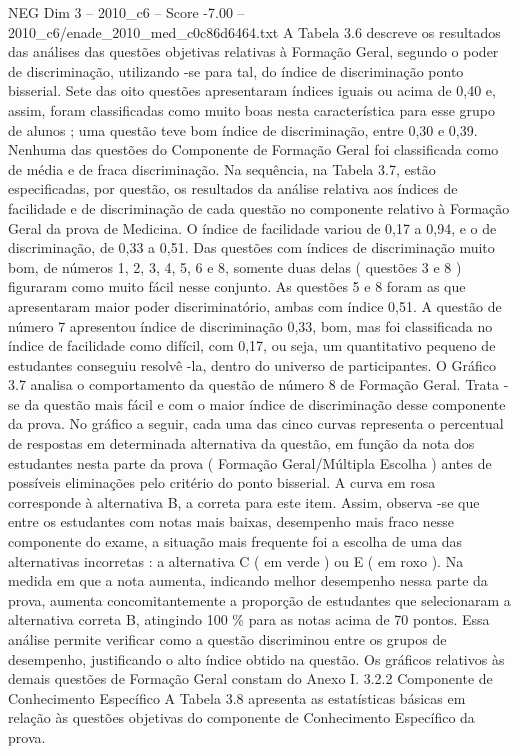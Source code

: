 \begin{textsample}{NEG Dim 3 – 2010\_c6 – Score -7.00 – 2010\_c6/enade\_2010\_med\_c0c86d6464.txt}
A Tabela 3.6 descreve os resultados das análises das questões objetivas relativas à Formação Geral, segundo o poder de discriminação, utilizando -se para tal, do índice de discriminação ponto bisserial.
Sete das oito questões apresentaram índices iguais ou acima de 0,40 e, assim, foram classificadas como muito boas nesta característica para esse grupo de alunos ; uma questão teve bom índice de discriminação, entre 0,30 e 0,39.
Nenhuma das questões do Componente de Formação Geral foi classificada como de média e de fraca discriminação.
Na sequência, na Tabela 3.7, estão especificadas, por questão, os resultados da análise relativa aos índices de facilidade e de discriminação de cada questão no componente relativo à Formação Geral da prova de Medicina.
O índice de facilidade variou de 0,17 a 0,94, e o de discriminação, de 0,33 a 0,51.
Das questões com índices de discriminação muito bom, de números 1, 2, 3, 4, 5, 6 e 8, somente duas delas ( questões 3 e 8 ) figuraram como muito fácil nesse conjunto.
As questões 5 e 8 foram as que apresentaram maior poder discriminatório, ambas com índice 0,51.
A questão de número 7 apresentou índice de discriminação 0,33, bom, mas foi classificada no índice de facilidade como difícil, com 0,17, ou seja, um quantitativo pequeno de estudantes conseguiu resolvê -la, dentro do universo de participantes.
O Gráfico 3.7 analisa o comportamento da questão de número 8 de Formação Geral.
Trata -se da questão mais fácil e com o maior índice de discriminação desse componente da prova.
No gráfico a seguir, cada uma das cinco curvas representa o percentual de respostas em determinada alternativa da questão, em função da nota dos estudantes nesta parte da prova ( Formação Geral/Múltipla Escolha ) antes de possíveis eliminações pelo critério do ponto bisserial.
A curva em rosa corresponde à alternativa B, a correta para este item.
Assim, observa -se que entre os estudantes com notas mais baixas, desempenho mais fraco nesse componente do exame, a situação mais frequente foi a escolha de uma das alternativas incorretas : a alternativa C ( em verde ) ou E ( em roxo ).
Na medida em que a nota aumenta, indicando melhor desempenho nessa parte da prova, aumenta concomitantemente a proporção de estudantes que selecionaram a alternativa correta B, atingindo 100 \% para as notas acima de 70 pontos.
Essa análise permite verificar como a questão discriminou entre os grupos de desempenho, justificando o alto índice obtido na questão.
Os gráficos relativos às demais questões de Formação Geral constam do Anexo I. 3.2.2 Componente de Conhecimento Específico A Tabela 3.8 apresenta as estatísticas básicas em relação às questões objetivas do componente de Conhecimento Específico da prova.

\end{textsample}
